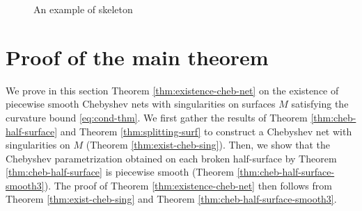 \documentclass{article}
\newcommand{\R}{\mathbb{R}}
\newcommand{\surf}{M}
\newcommand{\HalfP}{S}
\newcommand{\halfP}{B}
\newcommand{\Nver}{\mathcal{N}_{\mathrm{ver}}}
\newcommand{\Npol}{\mathcal{N}_{\mathrm{pol}}}
\theoremstyle{remark}
\theoremstyle{prpart}
\begin{document}
\begin{figure}[!htp]
  \caption{An example of skeleton}  \label{fig:skeleton}
\end{figure}

\section{Proof of the main theorem}\label{subsec:cheb-net-sing}
We prove in this section Theorem \ref{thm:existence-cheb-net} on the existence of piecewise smooth Chebyshev nets with singularities on surfaces $\surf$ satisfying the curvature bound \eqref{eq:cond-thm}.
We first gather the results of Theorem  \ref{thm:cheb-half-surface} and Theorem \ref{thm:splitting-surf} to construct a Chebyshev net with singularities on $\surf$ (Theorem \ref{thm:exist-cheb-sing}). Then, we show that the Chebyshev parametrization obtained on each broken half-surface by Theorem \ref{thm:cheb-half-surface} is piecewise smooth (Theorem \ref{thm:cheb-half-surface-smooth3}). The proof of Theorem \ref{thm:existence-cheb-net} then follows from Theorem \ref{thm:exist-cheb-sing} and Theorem \ref{thm:cheb-half-surface-smooth3}.
\end{document}
